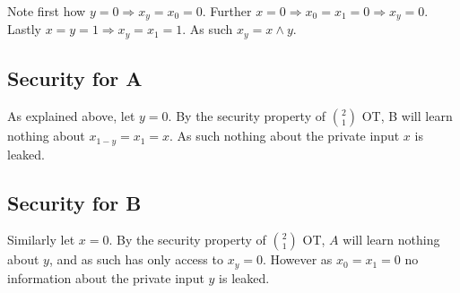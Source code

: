 \documentclass[a4paper]{scrreprt}
\begin{document}
Note first how $y = 0 \Rightarrow x_y = x_0 = 0$. Further $x = 0 \Rightarrow
x_0 = x_1 = 0 \Rightarrow x_y = 0$. Lastly $x = y = 1 \Rightarrow x_y = x_1 =
1$. As such $x_y = x \land y$.

\subsection{Security for A}

As explained above, let $y = 0$. By the security property of $\binom{2}{1}$ OT,
B will learn nothing about $x_{1 - y} = x_1 = x$. As such nothing about the
private input $x$ is leaked.

\subsection{Security for B}

Similarly let $x = 0$. By the security property of $\binom{2}{1}$ OT, $A$ will
learn nothing about $y$, and as such has only access to $x_y = 0$.  However as
$x_0 = x_1 = 0$ no information about the private input $y$ is leaked.

\printbibliography
\end{document}
